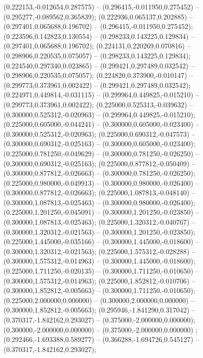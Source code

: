  (0.222153,-0.012654,0.287575) -- (0.296415,-0.011950,0.275452) -- (0.295277,-0.089562,0.365839);
 (0.222936,0.065137,0.202885) -- (0.297401,0.065688,0.196702) -- (0.296415,-0.011950,0.275452);
 (0.223596,0.142823,0.130554) -- (0.298233,0.143225,0.129834) -- (0.297401,0.065688,0.196702);
 (0.224131,0.220269,0.070816) -- (0.298906,0.220535,0.075057) -- (0.298233,0.143225,0.129834);
 (0.224540,0.297340,0.023865) -- (0.299421,0.297489,0.032542) -- (0.298906,0.220535,0.075057);
 (0.224820,0.373900,-0.010147) -- (0.299773,0.373961,0.002422) -- (0.299421,0.297489,0.032542);
 (0.224971,0.449814,-0.031115) -- (0.299964,0.449825,-0.015210) -- (0.299773,0.373961,0.002422);
 (0.225000,0.525313,-0.039632) -- (0.300000,0.525312,-0.020963) -- (0.299964,0.449825,-0.015210);
 (0.225000,0.605000,-0.044241) -- (0.300000,0.605000,-0.023400) -- (0.300000,0.525312,-0.020963);
 (0.225000,0.690312,-0.047573) -- (0.300000,0.690312,-0.025163) -- (0.300000,0.605000,-0.023400);
 (0.225000,0.781250,-0.049629) -- (0.300000,0.781250,-0.026250) -- (0.300000,0.690312,-0.025163);
 (0.225000,0.877812,-0.050409) -- (0.300000,0.877812,-0.026663) -- (0.300000,0.781250,-0.026250);
 (0.225000,0.980000,-0.049913) -- (0.300000,0.980000,-0.026400) -- (0.300000,0.877812,-0.026663);
 (0.225000,1.087813,-0.048140) -- (0.300000,1.087813,-0.025463) -- (0.300000,0.980000,-0.026400);
 (0.225000,1.201250,-0.045091) -- (0.300000,1.201250,-0.023850) -- (0.300000,1.087813,-0.025463);
 (0.225000,1.320312,-0.040767) -- (0.300000,1.320312,-0.021563) -- (0.300000,1.201250,-0.023850);
 (0.225000,1.445000,-0.035166) -- (0.300000,1.445000,-0.018600) -- (0.300000,1.320312,-0.021563);
 (0.225000,1.575312,-0.028288) -- (0.300000,1.575312,-0.014963) -- (0.300000,1.445000,-0.018600);
 (0.225000,1.711250,-0.020135) -- (0.300000,1.711250,-0.010650) -- (0.300000,1.575312,-0.014963);
 (0.225000,1.852812,-0.010706) -- (0.300000,1.852812,-0.005663) -- (0.300000,1.711250,-0.010650);
 (0.225000,2.000000,0.000000) -- (0.300000,2.000000,0.000000) -- (0.300000,1.852812,-0.005663);
 (0.295946,-1.841290,0.317042) -- (0.370317,-1.842162,0.293027) -- (0.375000,-2.000000,0.000000);
 (0.300000,-2.000000,0.000000) -- (0.375000,-2.000000,0.000000) ;
 (0.292466,-1.693388,0.589277) -- (0.366288,-1.694726,0.545127) -- (0.370317,-1.842162,0.293027);
